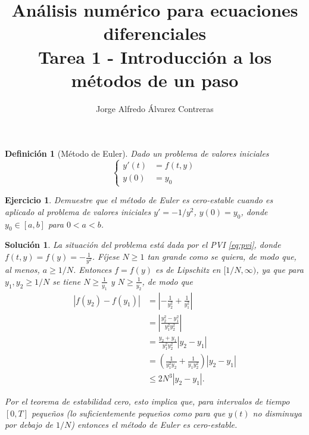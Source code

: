 \documentclass[11pt]{article}
\title{Análisis numérico para ecuaciones diferenciales \\
Tarea 1 - Introducción a los métodos de un paso}
\author{Jorge Alfredo Álvarez Contreras}
\newtheorem{definition}{Definición}
\newtheorem{exercise}{Ejercicio}
\newtheorem*{sol}{Solución}
\begin{document}
\maketitle

\begin{definition}[Método de Euler]
  Dado un problema de valores iniciales
  \begin{equation}\label{eq:pvi}
    \left\{
      \begin{aligned}
        y'(t) &= f(t,y) \\
        y(0) &= y_0
      \end{aligned}
    \right.
  \end{equation}
\end{definition}

\begin{exercise}
  Demuestre que el método de Euler es cero-estable cuando es aplicado
  al problema de valores iniciales $y'=-1/y^{2}$, $y(0)=y_0$, donde
  $y_0\in[a,b]$ para $0<a<b$.
\end{exercise}

\begin{sol}
  La situación del problema está dada por el PVI \eqref{eq:pvi},
  donde $f(t,y)=f(y)=-\frac{1}{y^{2}}$.
  Fíjese $N\geq 1$ tan grande como se quiera,
  de modo que, al menos, $a\geq 1 / N$. Entonces $f=f(y)$ es de
  Lipschitz en $[1 / N,\infty)$, ya que para $y_1,y_2\geq 1 / N$ se
  tiene $N\geq \frac{1}{y_1}$ y $N\geq \frac{1}{y_2}$, de modo que
  \begin{align}
    |f(y_2)-f(y_1)|
    &= \left|-\frac{1}{y_2^{2}}+\frac{1}{y_1^{2}}\right| \\
    &= \left|\frac{y_2^{2}-y_1^{2}}{y_1^{2}y_2^{2}}\right| \\
    &= \frac{y_2+y_1}{y_1^{2}y_2^{2}} |y_2-y_1| \\
    &=
    \left(
      \frac{1}{y_1^{2}y_2}
      +
      \frac{1}{y_1y_2^{2}} 
    \right)
    |y_2-y_1| \\
    &\leq 2N^{3} |y_2-y_1|
  .\end{align}

  Por el teorema de estabilidad cero, esto implica que, para
  intervalos de tiempo $[0,T]$ pequeños (lo suficientemente pequeños
  como para que $y(t)$ no disminuya por debajo de $1 / N$)
  entonces el método de Euler es cero-estable.
\end{sol}
\end{document}
